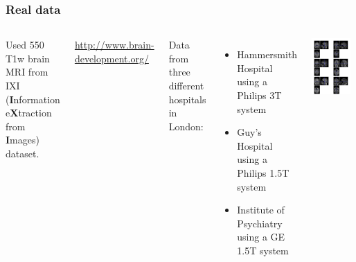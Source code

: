 \begin{frame}
\frametitle{Real data}
\begin{columns}[c]
Used 550 T1w brain MRI from IXI ({\bf I}nformation e{\bf X}traction from {\bf I}mages) dataset.

\url{http://www.brain-development.org/}

Data from three different hospitals in London:
\begin{itemize}
\item{Hammersmith Hospital using a Philips 3T system}
\item{Guy's Hospital using a Philips 1.5T system}
\item{Institute of Psychiatry using a GE 1.5T system}
\end{itemize}

\includegraphics[width=0.9\textwidth]{orig_ixi}
\end{columns}
\end{frame}

